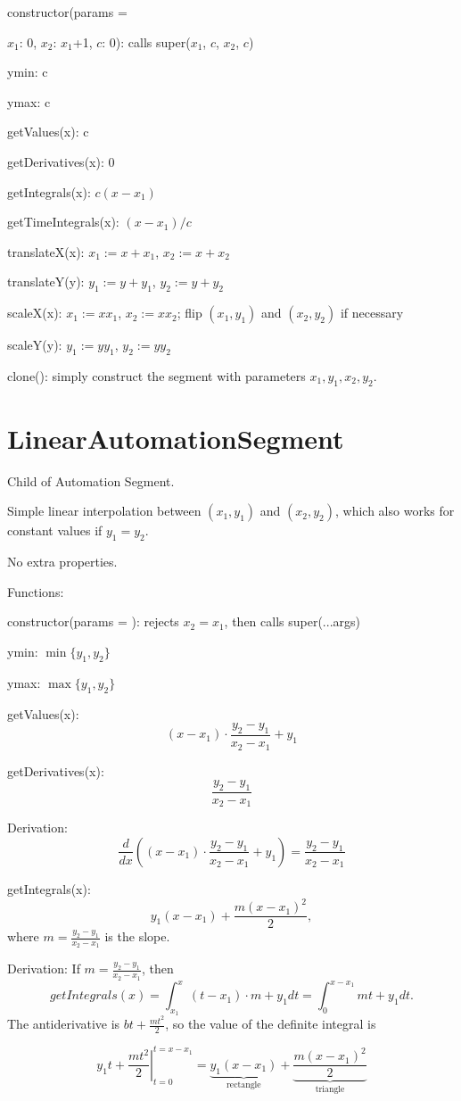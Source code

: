 \documentclass{article}
\begin{document}
constructor(params = {$x_1$: 0, $x_2$: $x_1$+1, $c$: 0): calls super($x_1$, $c$, $x_2$, $c$)

ymin: c

ymax: c

getValues(x): c

getDerivatives(x): 0

getIntegrals(x): $c(x-x_1)$

getTimeIntegrals(x): $(x-x_1)/c$

translateX(x): $x_1:=x+x_1$, $x_2:=x+x_2$

translateY(y): $y_1:=y+y_1$, $y_2:=y+y_2$

scaleX(x): $x_1:=xx_1$, $x_2:=xx_2$; flip $(x_1, y_1)$ and $(x_2, y_2)$ if necessary

scaleY(y): $y_1:=yy_1$, $y_2:=yy_2$

clone(): simply construct the segment with parameters $x_1, y_1, x_2, y_2$.

\section{LinearAutomationSegment}

Child of Automation Segment.

Simple linear interpolation between $(x_1, y_1)$ and $(x_2, y_2)$, which also works for constant values if $y_1=y_2$.

No extra properties.

Functions:

constructor(params = {}): rejects $x_2 = x_1$, then calls super(...args)

ymin: $\min\{y_1, y_2\}$

ymax: $\max\{y_1, y_2\}$

getValues(x): $$(x - x_1) \cdot \frac{y_2 - y_1}{x_2 - x_1} + y_1$$

getDerivatives(x): $$\frac{y_2-y_1}{x_2-x_1}$$

Derivation: $$\frac{d}{dx}\left((x - x_1) \cdot \frac{y_2 - y_1}{x_2 - x_1} + y_1\right) = \frac{y_2 - y_1}{x_2 - x_1}$$

getIntegrals(x): $$y_1(x-x_1) + \frac{m(x-x_1)^2}{2},$$ where $m=\frac{y_2 - y_1}{x_2 - x_1}$ is the slope.

Derivation: If $m=\frac{y_2 - y_1}{x_2 - x_1}$, then $$getIntegrals(x) = \int_{x_1}^x (t - x_1) \cdot m + y_1 dt = \int_{0}^{x-x_1} mt + y_1 dt.$$ The antiderivative is $bt + \frac{mt^2}{2}$, so the value of the definite integral is

$$\left. y_1t + \frac{mt^2}{2} \right\vert _ {t=0} ^ {t=x-x_1} = \underbrace{y_1(x-x_1)}_{\text{rectangle}} + \underbrace{\frac{m(x-x_1)^2}{2}}_{\text{triangle}}$$

}
\end{document}
